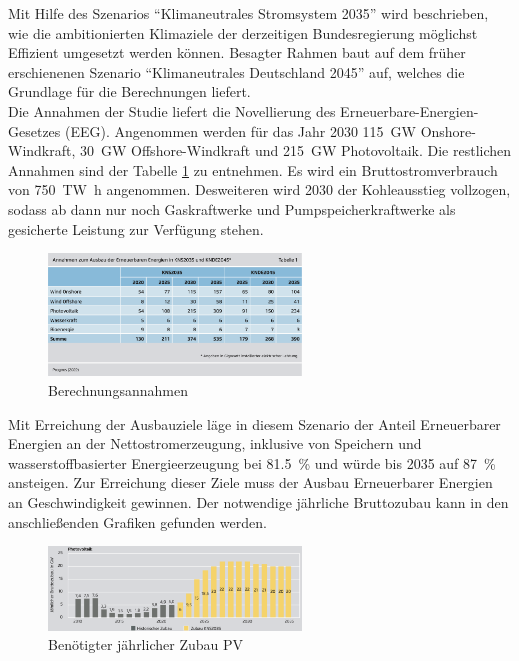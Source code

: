 	
		
		Mit Hilfe des Szenarios "`Klimaneutrales Stromsystem 2035"' wird beschrieben, wie die ambitionierten Klimaziele der derzeitigen Bundesregierung möglichst Effizient umgesetzt werden können. Besagter Rahmen baut auf dem früher erschienenen Szenario "`Klimaneutrales Deutschland 2045"' auf, welches die Grundlage für die Berechnungen liefert.\\
		Die Annahmen der Studie liefert die Novellierung des Erneuerbare-Energien-Gesetzes (EEG). Angenommen werden für das Jahr 2030 \SI{115}{\giga \watt} Onshore-Windkraft, \SI{30}{\giga \watt} Offshore-Windkraft und \SI{215}{\giga \watt} Photovoltaik. Die restlichen Annahmen sind der Tabelle \ref{Abb. Annahmen Agora2035} zu entnehmen.	Es wird ein Bruttostromverbrauch von \SI{750}{\tera \watt \hour} angenommen. Desweiteren wird 2030 der Kohleausstieg vollzogen, sodass ab dann nur noch Gaskraftwerke und Pumpspeicherkraftwerke als gesicherte Leistung zur Verfügung stehen.\\
		
		\begin{figure}[H]
			\centering
			\includegraphics[page=1, width=0.6\textwidth]{./anhang/Annahmen Agora2035.png}
			\caption{Berechnungsannahmen}
			\label{Abb. Annahmen Agora2035}
		\end{figure}
	
		Mit Erreichung der Ausbauziele läge in diesem Szenario der Anteil Erneuerbarer Energien an der Nettostromerzeugung, inklusive von Speichern und wasserstoffbasierter Energieerzeugung bei \SI{81,5}{\percent} und würde bis 2035 auf \SI{87}{\percent} ansteigen. Zur Erreichung dieser Ziele muss der Ausbau Erneuerbarer Energien an Geschwindigkeit gewinnen. Der notwendige jährliche Bruttozubau kann in den anschließenden Grafiken gefunden werden.\\
			
			\begin{figure}[H]
				\centering
				\includegraphics[page=1, clip, width=0.6\textwidth]{./anhang/Zubau PV Agora2035.png}
				\caption{Benötigter jährlicher Zubau PV}
				\label{Abb.Zubau PV Agora2035}
			\end{figure}
			
